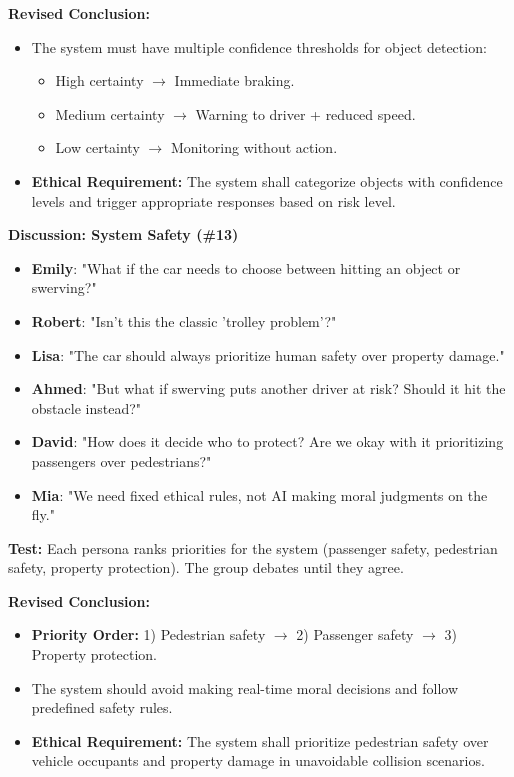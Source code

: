\begin{tcolorbox}
  \textbf{Revised Conclusion:}
  \begin{itemize}
      \item The system must have multiple confidence thresholds for object detection:
      \begin{itemize}
          \item High certainty $\rightarrow$ Immediate braking.
          \item Medium certainty $\rightarrow$ Warning to driver + reduced speed.
          \item Low certainty $\rightarrow$ Monitoring without action.
      \end{itemize}
      \item \textbf{Ethical Requirement:} The system shall categorize objects with confidence levels and trigger appropriate responses based on risk level.
  \end{itemize}
  
  \vspace{0.5em}
  \textbf{Discussion: System Safety (\#13)}
  
  \begin{itemize}
      \item \textbf{Emily}: "What if the car needs to choose between hitting an object or swerving?"
      \item \textbf{Robert}: "Isn’t this the classic 'trolley problem'?"
      \item \textbf{Lisa}: "The car should always prioritize human safety over property damage."
      \item \textbf{Ahmed}: "But what if swerving puts another driver at risk? Should it hit the obstacle instead?"
      \item \textbf{David}: "How does it decide who to protect? Are we okay with it prioritizing passengers over pedestrians?"
      \item \textbf{Mia}: "We need fixed ethical rules, not AI making moral judgments on the fly."
  \end{itemize}
  
  \textbf{Test:} Each persona ranks priorities for the system (passenger safety, pedestrian safety, property protection). The group debates until they agree.
  
  \textbf{Revised Conclusion:}
  \begin{itemize}
      \item \textbf{Priority Order:} 1) Pedestrian safety $\rightarrow$ 2) Passenger safety $\rightarrow$ 3) Property protection.
      \item The system should avoid making real-time moral decisions and follow predefined safety rules.
      \item \textbf{Ethical Requirement:} The system shall prioritize pedestrian safety over vehicle occupants and property damage in unavoidable collision scenarios.
  \end{itemize}
  

\end{tcolorbox}
